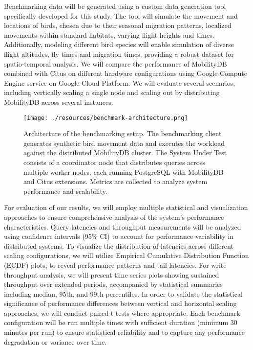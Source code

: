 \documentclass{article}
\begin{document}
Benchmarking data will be generated using a custom data generation tool specifically developed for this study.
The tool will simulate the movement and locations of birds, chosen due to their seasonal migration patterns,
localized movements within standard habitats, varying flight heights and times.
Additionally, modeling different bird species will enable simulation of diverse flight altitudes, fly times and
migration times, providing a robust dataset for spatio-temporal analysis.
%
We will compare the performance of MobilityDB combined with Citus on different hardware configurations using 
Google Compute Engine service on Google Cloud Platform.
We will evaluate several scenarios, including vertically scaling a single node and scaling out by distributing MobilityDB across several instances.

\begin{figure}[ht]
    \centering
    \texttt{[image: ./resources/benchmark-architecture.png]}
    \caption{
	Architecture of the benchmarking setup. 
	The benchmarking client generates synthetic bird movement data and executes the workload against 
	the distributed MobilityDB cluster. 
	The System Under Test consists of a coordinator node that distributes queries across multiple worker nodes,
	each running PostgreSQL with MobilityDB and Citus extensions. 
	Metrics are collected to analyze system performance and scalability.
    }
    \label{fig:image}
\end{figure}

For evaluation of our results, we will employ multiple statistical and visualization approaches to ensure
comprehensive analysis of the system's performance characteristics. Query latencies and throughput measurements
will be analyzed using confidence intervals (95\% CI) to account for performance variability in distributed systems. 
To visualize the distribution of latencies across different scaling configurations, we will utilize Empirical
Cumulative Distribution Function (ECDF) plots, to reveal performance patterns and tail latencies.
For write throughput analysis, we will present time series plots showing sustained throughput over extended
periods, accompanied by statistical summaries including median, 95th, and 99th percentiles.
In order to validate the statistical significance of performance differences between vertical and horizontal scaling
approaches, we will conduct paired t-tests where appropriate.
Each benchmark configuration will be run multiple times with sufficient duration (minimum 30 minutes per run)
to ensure statistical reliability and to capture any performance degradation or variance over time.
\end{document}
